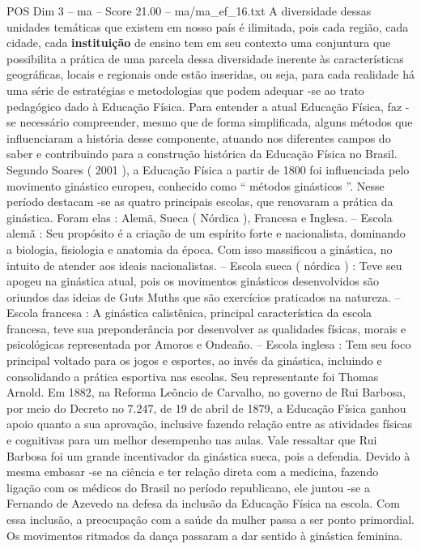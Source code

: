 \begin{textsample}{POS Dim 3 – ma – Score 21.00 – ma/ma\_ef\_16.txt}
A diversidade dessas unidades temáticas que existem em nosso país é ilimitada, pois cada região, cada cidade, cada \textbf{instituição} de ensino tem em seu contexto uma conjuntura que possibilita a prática de uma parcela dessa diversidade inerente às características geográficas, locais e regionais onde estão inseridas, ou seja, para cada realidade há uma série de estratégias e metodologias que podem adequar -se ao trato pedagógico dado à Educação Física.
Para entender a atual Educação Física, faz -se necessário compreender, mesmo que de forma simplificada, alguns métodos que influenciaram a história desse componente, atuando nos diferentes campos do saber e contribuindo para a construção histórica da Educação Física no Brasil.
Segundo Soares ( 2001 ), a Educação Física a partir de 1800 foi influenciada pelo movimento ginástico europeu, conhecido como “ métodos ginásticos ”.
Nesse período destacam -se as quatro principais escolas, que renovaram a prática da ginástica.
Foram elas : Alemã, Sueca ( Nórdica ), Francesa e Inglesa. – Escola alemã : Seu propósito é a criação de um espírito forte e nacionalista, dominando a biologia, fisiologia e anatomia da época.
Com isso massificou a ginástica, no intuito de atender aos ideais nacionalistas. – Escola sueca ( nórdica ) : Teve seu apogeu na ginástica atual, pois os movimentos ginásticos desenvolvidos são oriundos das ideias de Guts Muths que são exercícios praticados na natureza. – Escola francesa : A ginástica calistênica, principal característica da escola francesa, teve sua preponderância por desenvolver as qualidades físicas, morais e psicológicas representada por Amoros e Ondeaño. – Escola inglesa : Tem seu foco principal voltado para os jogos e esportes, ao invés da ginástica, incluindo e consolidando a prática esportiva nas escolas.
Seu representante foi Thomas Arnold.
Em 1882, na Reforma Leôncio de Carvalho, no governo de Rui Barbosa, por meio do Decreto no 7.247, de 19 de abril de 1879, a Educação Física ganhou apoio quanto a sua aprovação, inclusive fazendo relação entre as atividades físicas e cognitivas para um melhor desempenho nas aulas.
Vale ressaltar que Rui Barbosa foi um grande incentivador da ginástica sueca, pois a defendia.
Devido à mesma embasar -se na ciência e ter relação direta com a medicina, fazendo ligação com os médicos do Brasil no período republicano, ele juntou -se a Fernando de Azevedo na defesa da inclusão da Educação Física na escola.
Com essa inclusão, a preocupação com a saúde da mulher passa a ser ponto primordial.
Os movimentos ritmados da dança passaram a dar sentido à ginástica feminina.

\end{textsample}
